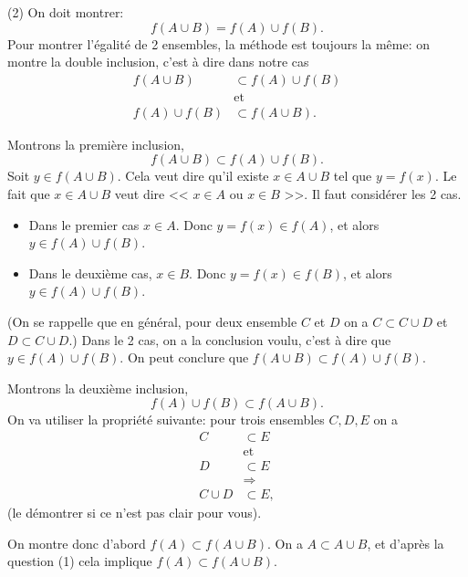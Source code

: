 \documentclass[12pt, a4paper,oneside]{article} %
\begin{document}
(2) On doit montrer:
\begin{equation}
	f(A \cup B)
	=
	f(A)
	\cup
	f(B)
	.
\end{equation}
Pour montrer l'égalité
de 2 ensembles,
la méthode est toujours la même:
on montre la double inclusion,
c'est à dire dans notre cas
\begin{align}
	f(A \cup B)
	&  \subset
	f(A)
	\cup
	f(B)
	\\
	& \text{et}
	\\
	f(A)
	\cup
	f(B)
	& \subset
	f(A \cup B)
	.
\end{align}

Montrons la première inclusion,
\begin{equation}
	f(A \cup B)
	 \subset
	f(A)
	\cup
	f(B)
	.
\end{equation}
Soit $ y \in f( A \cup B) $.
Cela veut dire qu'il existe
$ x \in A \cup B $
tel que
$ y = f(x) $.
Le fait que $ x \in A \cup B $
veut dire
<<
$x \in A$
ou
$x \in B$
>>.
Il faut considérer les 2 cas.
\begin{itemize}
	\item
		Dans le premier cas
		$ x \in A $.
		Donc
		$ y = f(x) \in f(A) $,
		et alors
		$ y \in f(A) \cup f(B) $.
	\item
		Dans le deuxième cas,
		$ x \in B $.
		Donc
		$ y = f(x) \in f(B) $,
		et alors
		$ y \in f(A) \cup f(B) $.
\end{itemize}
(On se rappelle que
en général, pour deux ensemble
$ C $ et $ D $ on a
$ C \subset C \cup D$ 
et
$ D \subset C \cup D$.)
Dans le 2 cas, on a la conclusion voulu,
c'est à dire que
$ y \in f(A) \cup f(B) $.
On peut conclure que
$ f(A \cup B) \subset f(A) \cup f(B) $.

Montrons la deuxième inclusion,
\begin{equation}
	f(A)
	\cup
	f(B)
	\subset
	f(A \cup B)
	.
\end{equation}
On va utiliser la propriété suivante:
pour trois ensembles $ C, D, E $
on a
\begin{align}
	C & \subset E
	\\
	& \text{et}
	\\
	D & \subset E
	\\
	& \Rightarrow
	\\
	C \cup D & \subset E
	,
\end{align}
(le démontrer si ce n'est pas clair pour vous).

On montre donc d'abord $ f(A) \subset f(A \cup B) $.
On a $ A \subset A \cup B $,
et d'après la question (1)
cela implique
$ f(A) \subset f(A \cup B)$.
\end{document}
